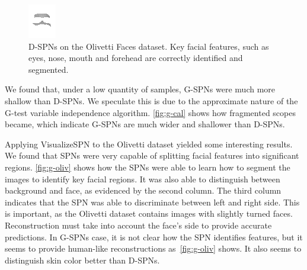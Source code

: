 \documentclass{article}
\begin{document}
\begin{figure}[!b]
\begin{minipage}[c]{.21\linewidth}
    \centering\centerline{\includegraphics[width=\linewidth]{imgs/dennis_oliv/0/sums/1054_1325.png}}
  \end{minipage}
  \caption{D-SPNs on the Olivetti Faces dataset. Key facial features, such as eyes, nose, mouth and
    forehead are correctly identified and segmented.\label{fig:g-oliv}}
\end{figure}

We found that, under a low quantity of samples, G-SPNs were much more shallow than D-SPNs. We
speculate this is due to the approximate nature of the G-test variable independence algorithm.
\autoref{fig:g-cal} shows how fragmented scopes became, which indicate G-SPNs are much wider and
shallower than D-SPNs.

Applying VisualizeSPN to the Olivetti dataset yielded some interesting results. We found that SPNs
were very capable of splitting facial features into significant regions. \autoref{fig:g-oliv} shows
how the SPNs were able to learn how to segment the images to identify key facial regions. It was
also able to distinguish between background and face, as evidenced by the second column. The third
column indicates that the SPN was able to discriminate between left and right side. This is
important, as the Olivetti dataset contains images with slightly turned faces. Reconstruction must
take into account the face's side to provide accurate predictions. In G-SPNs case, it is not clear
how the SPN identifies features, but it seems to provide human-like reconstructions
as~\autoref{fig:g-oliv} shows. It also seems to distinguish skin color better than D-SPNs.
\end{document}
